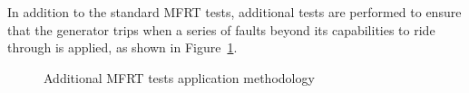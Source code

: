 In addition to the standard MFRT tests, additional tests are performed to ensure that the generator trips when a series of faults beyond its capabilities to ride through is applied, as shown in Figure~\ref{fig:mfrt-should-trip-diagram}.

\begin{figure}[h]
	\centering
	
	\caption{Additional MFRT tests application methodology}
	\label{fig:mfrt-should-trip-diagram}
\end{figure}